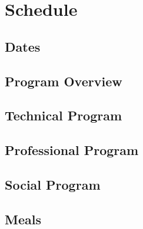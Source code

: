 \section{Schedule}


\subsection{Dates}


\subsection{Program Overview}


\subsection{Technical Program}


\subsection{Professional Program}


\subsection{Social Program}



\subsection{Meals} 


